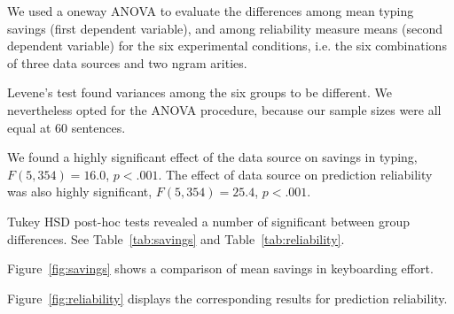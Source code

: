 \documentclass{sigchi}
\begin{document}
We used a oneway ANOVA to evaluate the differences among mean typing
savings (first dependent variable), and among reliability measure
means (second dependent variable) for the six experimental conditions,
i.e.  the six combinations of three data sources and two ngram
arities.

Levene's test found variances among the six groups to be different.
We nevertheless opted for the ANOVA procedure, because our sample
sizes were all equal at 60 sentences.

We found a highly significant effect of the data source on savings in
typing, $F(5,354)=16.0$, $p<.001$. The effect of data source on
prediction reliability was also highly significant, $F(5,354)=25.4$,
$p<.001$.

Tukey HSD post-hoc tests revealed a number of significant between group
differences. See Table~\ref{tab:savings} and Table~\ref{tab:reliability}.

Figure~\ref{fig:savings} shows a comparison of mean savings in
keyboarding effort.

Figure~\ref{fig:reliability} displays the corresponding results for
prediction reliability.

\begingroup
\everymath{\scriptstyle}
\tiny
\end{document}
